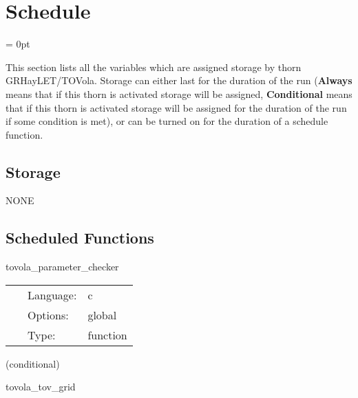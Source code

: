 
\section{Schedule} 


\parskip = 0pt


\noindent This section lists all the variables which are assigned storage by thorn GRHayLET/TOVola.  Storage can either last for the duration of the run ({\bf Always} means that if this thorn is activated storage will be assigned, {\bf Conditional} means that if this thorn is activated storage will be assigned for the duration of the run if some condition is met), or can be turned on for the duration of a schedule function.


\subsection*{Storage}NONE
\subsection*{Scheduled Functions}
\vspace{5mm}


\hspace{5mm} tovola\_parameter\_checker 

\hspace{5mm}{\it check if interpollation stencil does not exceed maximum value, and eos type is used appropriately. } 


\hspace{5mm}

 \begin{tabular*}{160mm}{cll} 
~ & Language:  & c \\ 
~ & Options:  & global \\ 
~ & Type:  & function \\ 
\end{tabular*} 


\vspace{5mm}

   (conditional) 

\hspace{5mm} tovola\_tov\_grid 

\hspace{5mm}{\it group for the tov initial data } 


\hspace{5mm}

